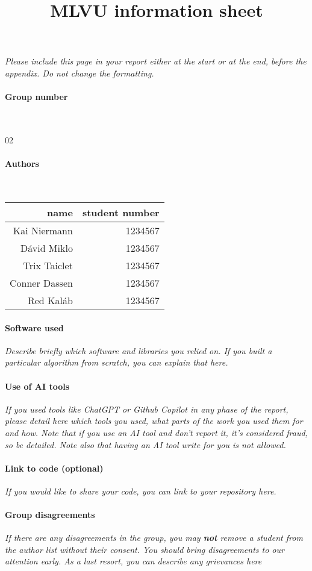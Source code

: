 \title{MLVU information sheet}
\author{}
\date{}
\maketitle

\noindent \textit{Please include this page in your report either at the start or at the end, before the appendix. Do not change the formatting.}

\paragraph{Group number}~

02

\paragraph{Authors}~

\begin{tabular}{r r}
name &student number \\
\hline
Kai Niermann & 1234567 \\
Dávid Miklo & 1234567 \\
Trix Taiclet & 1234567 \\
Conner Dassen & 1234567 \\
Red Kaláb & 1234567 \\
\end{tabular}

\paragraph{Software used} \textit{Describe briefly which software and libraries you relied on. If you built a particular algorithm from scratch, you can explain that here.}

\paragraph{Use of AI tools} \textit{If you used tools like ChatGPT or Github Copilot in any phase of the report, please detail here which tools you used, what parts of the work you used them for and how. Note that if you use an AI tool and don't report it, it's considered fraud, so be detailed. Note also that having an AI tool write for you is not allowed. }

\paragraph{Link to code (optional)} \textit{If you would like to share your code, you can link to your repository here.}

\paragraph{Group disagreements} \textit{If there are any disagreements in the group, you may \textbf{not} remove a student from the author list without their consent. You should bring disagreements to our attention early. As a last resort, you can describe any grievances here}